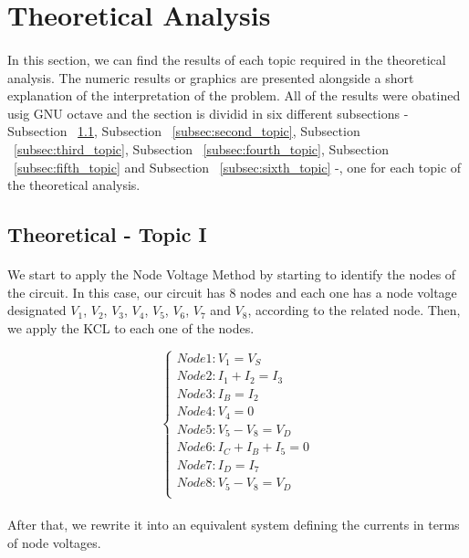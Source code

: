 \section{Theoretical Analysis}
\label{sec:analysis}

\paragraph{}
In this section, we can find the results of each topic required in the theoretical analysis. The numeric results or graphics are presented alongside a short explanation of the interpretation of the problem. All of the results were obatined usig GNU octave and the section is dividid in six different subsections - Subsection ~\ref{subsec:first_topic}, Subsection ~\ref{subsec:second_topic}, Subsection ~\ref{subsec:third_topic}, Subsection ~\ref{subsec:fourth_topic}, Subsection ~\ref{subsec:fifth_topic} and Subsection ~\ref{subsec:sixth_topic} -, one for each topic of the theoretical analysis.

\subsection{Theoretical - Topic I}
\label{subsec:first_topic}

\paragraph{}
We start to apply the Node Voltage Method by starting to identify the nodes of the circuit. In this case, our circuit has 8 nodes and each one has a node voltage designated $V_1$, $V_2$, $V_3$, $V_4$, $V_5$, $V_6$, $V_7$ and $V_8$, according to the related node. Then, we apply the KCL to each one of the nodes.

\[
\left\{\begin{matrix}
Node 1: V_1 = V_S\\
Node 2: I_1 + I_2 = I_3\\
Node 3: I_B = I_2\\
Node 4: V_4 = 0\\
Node 5: V_5 -V_8 = V_D\\
Node 6: I_C + I_B + I_5 = 0\\
Node 7: I_D = I_7\\
Node 8: V_5 -V_8 = V_D\\
\end{matrix}\right.
\]

\paragraph{}
After that, we rewrite it into an equivalent system defining the currents in terms of node voltages.

